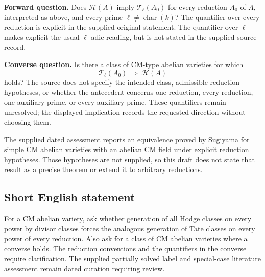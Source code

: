 \documentclass[11pt]{article}
\begin{document}
\textbf{Forward question.} Does \(\mathcal H(A)\) imply \(\mathcal T_\ell(A_0)\) for every reduction \(A_0\) of \(A\), interpreted as above, and every prime \(\ell\ne\operatorname{char}(k)\)? The quantifier over every reduction is explicit in the supplied original statement. The quantifier over \(\ell\) makes explicit the usual \(\ell\)-adic reading, but is not stated in the supplied source record.

\textbf{Converse question.} Is there a class of CM-type abelian varieties for which
\[
\mathcal T_\ell(A_0)\ \Longrightarrow\ \mathcal H(A)
\]
holds? The source does not specify the intended class, admissible reduction hypotheses, or whether the antecedent concerns one reduction, every reduction, one auxiliary prime, or every auxiliary prime. These quantifiers remain unresolved; the displayed implication records the requested direction without choosing them.

The supplied dated assessment reports an equivalence proved by Sugiyama for simple CM abelian varieties with an abelian CM field under explicit reduction hypotheses. Those hypotheses are not supplied, so this draft does not state that result as a precise theorem or extend it to arbitrary reductions.
\subsection{Short English statement}
For a CM abelian variety, ask whether generation of all Hodge classes on every power by divisor classes forces the analogous generation of Tate classes on every power of every reduction. Also ask for a class of CM abelian varieties where a converse holds. The reduction conventions and the quantifiers in the converse require clarification. The supplied partially solved label and special-case literature assessment remain dated curation requiring review.
\end{document}
